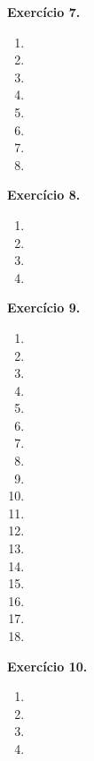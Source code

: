 \documentclass[12pt,a4paper]{article}
\begin{document}
\vspace{0.5cm}
\noindent\textbf{Exercício 7.}
\begin{enumerate}
    \renewcommand{\theenumi}{\alph{enumi}}
    \renewcommand{\labelenumi}{\theenumi)}
    \item 
    \item 
    \item 
    \item 
    \item 
    \item 
    \item 
    \item 
\end{enumerate}

\vspace{0.5cm}
\noindent\textbf{Exercício 8.}
\begin{enumerate}
    \renewcommand{\theenumi}{\alph{enumi}}
    \renewcommand{\labelenumi}{\theenumi)}
    \item 
    \item 
    \item 
    \item 
\end{enumerate}

\vspace{0.5cm}
\noindent\textbf{Exercício 9.}
\begin{enumerate}
    \renewcommand{\theenumi}{\alph{enumi}}
    \renewcommand{\labelenumi}{\theenumi)}
    \item 
    \item 
    \item 
    \item 
    \item 
    \item 
    \item 
    \item 
    \item 
    \item 
    \item 
    \item 
    \item 
    \item 
    \item 
    \item 
    \item 
    \item 
\end{enumerate}

\vspace{0.5cm}
\noindent\textbf{Exercício 10.}
\begin{enumerate}
    \renewcommand{\theenumi}{\alph{enumi}}
    \renewcommand{\labelenumi}{\theenumi)}
    \item 
    \item 
    \item 
    \item 
\end{enumerate}
\end{document}

